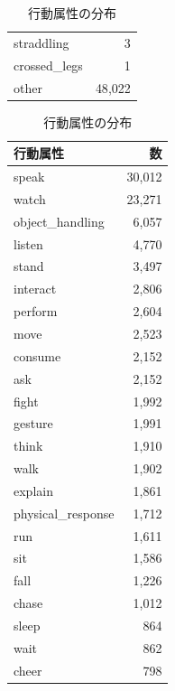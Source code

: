 \documentclass[a4j,12pt,dvipdfmx]{jsreport}
\begin{document}
\begin{table}[htbp]
\begin{minipage}[t]{0.48\linewidth}
\begin{tabular}{lr}
         straddling    & 3        \\
         crossed\_legs & 1        \\
         other         & 48{,}022 \\
         \bottomrule
      \end{tabular}
   \end{minipage}
   \hfill
   \begin{minipage}[t]{0.48\linewidth}
      \centering
      \caption{行動属性の分布}
      \label{tab:ci_action_enum_stats}
      \begin{tabular}{lr}
         \toprule
         行動属性               & 数        \\
         \midrule
         speak              & 30{,}012 \\
         watch              & 23{,}271 \\
         object\_handling   & 6{,}057  \\
         listen             & 4{,}770  \\
         stand              & 3{,}497  \\
         interact           & 2{,}806  \\
         perform            & 2{,}604  \\
         move               & 2{,}523  \\
         consume            & 2{,}152  \\
         ask                & 2{,}152  \\
         fight              & 1{,}992  \\
         gesture            & 1{,}991  \\
         think              & 1{,}910  \\
         walk               & 1{,}902  \\
         explain            & 1{,}861  \\
         physical\_response & 1{,}712  \\
         run                & 1{,}611  \\
         sit                & 1{,}586  \\
         fall               & 1{,}226  \\
         chase              & 1{,}012  \\
         sleep              & 864      \\
         wait               & 862      \\
         cheer              & 798      \\

\end{tabular}
\end{minipage}
\end{table}
\end{document}

